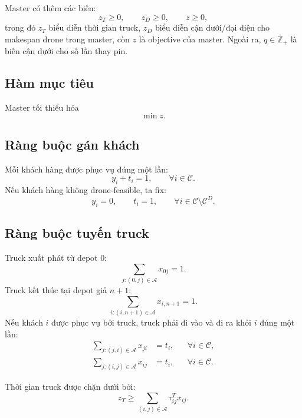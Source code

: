 \documentclass[12pt,a4paper]{article}
\newcommand{\C}{\mathcal{C}}
\newcommand{\CD}{\mathcal{C}^{D}}
\newcommand{\A}{\mathcal{A}}
\begin{document}
Master có thêm các biến:
\[
    z_T\ge 0,\qquad z_D\ge 0,\qquad z\ge 0,
\]
trong đó $z_T$ biểu diễn thời gian truck, $z_D$ biểu diễn cận dưới/đại diện cho makespan drone trong master, còn $z$ là objective của master. Ngoài ra, $q\in\mathbb{Z}_+$ là biến cận dưới cho số lần thay pin.

\subsection{Hàm mục tiêu}

Master tối thiểu hóa
\begin{equation}
    \min z.
    \label{eq:master-obj}
\end{equation}

\subsection{Ràng buộc gán khách}

Mỗi khách hàng được phục vụ đúng một lần:
\begin{equation}
    y_i+t_i=1,\qquad \forall i\in \C.
    \label{eq:assign}
\end{equation}
Nếu khách hàng không drone-feasible, ta fix:
\begin{equation}
    y_i=0,\qquad t_i=1,\qquad \forall i\in \C\setminus \CD.
    \label{eq:not-drone-feasible}
\end{equation}

\subsection{Ràng buộc tuyến truck}

Truck xuất phát từ depot $0$:
\begin{equation}
    \sum_{j:(0,j)\in \A} x_{0j}=1.
    \label{eq:truck-start}
\end{equation}
Truck kết thúc tại depot giả $n+1$:
\begin{equation}
    \sum_{i:(i,n+1)\in \A} x_{i,n+1}=1.
    \label{eq:truck-end}
\end{equation}
Nếu khách $i$ được phục vụ bởi truck, truck phải đi vào và đi ra khỏi $i$ đúng một lần:
\begin{align}
    \sum_{j:(j,i)\in \A}x_{ji} &= t_i, && \forall i\in \C, \label{eq:truck-in}\\
    \sum_{j:(i,j)\in \A}x_{ij} &= t_i, && \forall i\in \C. \label{eq:truck-out}
\end{align}

Thời gian truck được chặn dưới bởi:
\begin{equation}
    z_T\ge \sum_{(i,j)\in \A}\tau^T_{ij}x_{ij}.
    \label{eq:truck-time-master}
\end{equation}
\end{document}
